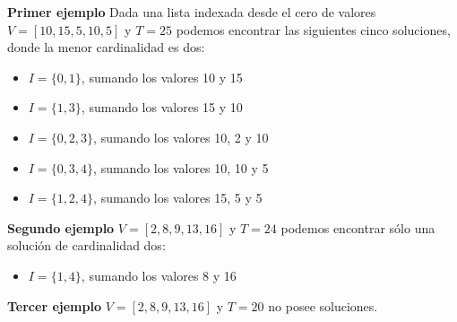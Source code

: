 \vskip 8pt
\textbf{Primer ejemplo}
\vskip 8pt
Dada una lista indexada desde el cero de valores $V=[10, 15, 5, 10, 5]$ y $T=25$ podemos encontrar las siguientes cinco soluciones, donde la menor cardinalidad es dos:
\begin{itemize}
	\item $I=\{0, 1\}$, sumando los valores 10 y 15
	\item $I=\{1, 3\}$, sumando los valores 15 y 10
	\item $I=\{0, 2, 3\}$, sumando los valores 10, 2 y 10
	\item $I=\{0, 3, 4\}$, sumando los valores 10, 10 y 5
	\item $I=\{1, 2, 4\}$, sumando los valores 15, 5 y 5
\end{itemize}

\textbf{Segundo ejemplo}
\vskip 8pt
$V=[2, 8, 9, 13, 16]$ y $T=24$ podemos encontrar sólo una solución de cardinalidad dos:
\begin{itemize}
	\item $I=\{1, 4\}$, sumando los valores 8 y 16
\end{itemize}

\textbf{Tercer ejemplo}
\vskip 8pt
$V=[2, 8, 9, 13, 16]$ y $T=20$ no posee soluciones.